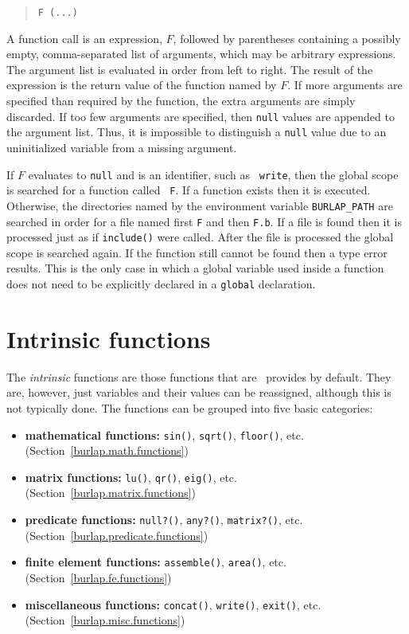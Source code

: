 \begin{quote}
\begin{verbatim}
F (...)
\end{verbatim}
\end{quote}

A function call is an expression, $F$, followed by parentheses
containing a possibly empty, comma-separated list of arguments, which
may be arbitrary expressions.  The argument list is evaluated in order
from left to right.  The result of the expression is the return value
of the function named by $F$.  If more arguments are specified than
required by the function, the extra arguments are simply discarded.
If too few arguments are specified, then {\tt null} values are
appended to the argument list.  Thus, it is impossible to distinguish
a {\tt null} value due to an uninitialized variable from a missing
argument.

If $F$ evaluates to {\tt null} and is an identifier, such as {\tt
write}, then the global scope is searched for a function called {\tt
F}.  If a function exists then it is executed.  Otherwise, the
directories named by the environment variable {\tt BURLAP\_PATH} are
searched in order for a file named first {\tt F} and then {\tt F.b}.
If a file is found then it is processed just as if {\tt include()}
were called.  After the file is processed the global scope is searched
again.  If the function still cannot be found then a type error
results.  This is the only case in which a global variable used inside
a function does not need to be explicitly declared in a {\tt global}
declaration.


\section{Intrinsic functions}
\label{burlap.syntax.intrinsics}

The {\em intrinsic} functions are those functions that are \burlap\
provides by default.  They are, however, just variables and their
values can be reassigned, although this is not typically done.  The
functions can be grouped into five basic categories:

\begin{itemize}
\item{\bf mathematical functions:}
{\tt sin()}, {\tt sqrt()}, {\tt floor()}, etc.
(Section~\ref{burlap.math.functions})

\item{\bf matrix functions:}
{\tt lu()}, {\tt qr()}, {\tt eig()}, etc.
(Section~\ref{burlap.matrix.functions})

\item{\bf predicate functions:}
{\tt null?()}, {\tt any?()}, {\tt matrix?()}, etc.
(Section~\ref{burlap.predicate.functions})

\item{\bf finite element functions:}
{\tt assemble()}, {\tt area()}, etc.
(Section~\ref{burlap.fe.functions})

\item{\bf miscellaneous functions:}
{\tt concat()}, {\tt write()}, {\tt exit()}, etc.
(Section~\ref{burlap.misc.functions})
\end{itemize}


